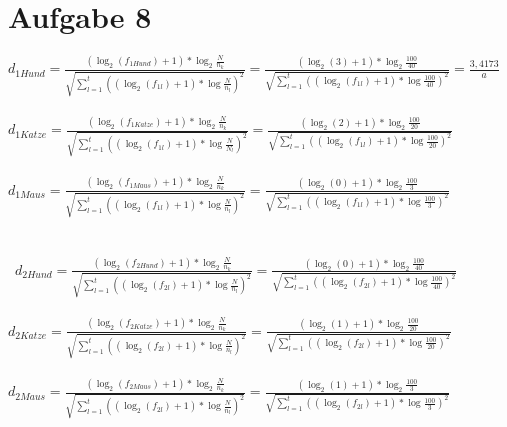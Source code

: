 \section*{Aufgabe 8}

$d_{1Hund} =\frac{(\log_{2}(f_{1Hund}) + 1) * \log_{2}\frac{N}{n_{k}}}{\sqrt{\sum_{l=1}^{t}((\log_{2}(f_{1l}) + 1) * \log \frac{N}{n_{l}})^{2}}} = \frac{(\log_{2}(3) + 1) * \log_{2}\frac{100}{40}}{\sqrt{\sum_{l=1}^{t}((\log_{2}(f_{1l}) + 1) * \log \frac{100}{40})^{2}}} = \frac{3,4173}{a}$ \\
\ \\
$d_{1Katze} =\frac{(\log_{2}(f_{1Katze}) + 1) * \log_{2}\frac{N}{n_{k}}}{\sqrt{\sum_{l=1}^{t}((\log_{2}(f_{1l}) + 1) * \log \frac{N}{N_{l}})^{2}}} = \frac{(\log_{2}(2) + 1) * \log_{2}\frac{100}{20}}{\sqrt{\sum_{l=1}^{t}((\log_{2}(f_{1l}) + 1) * \log \frac{100}{20})^{2}}}$ \\
\ \\
$d_{1Maus} =\frac{(\log_{2}(f_{1Maus}) + 1) * \log_{2}\frac{N}{n_{k}}}{\sqrt{\sum_{l=1}^{t}((\log_{2}(f_{1l}) + 1) * \log \frac{N}{n_{l}})^{2}}} = \frac{(\log_{2}(0) + 1) * \log_{2}\frac{100}{3}}{\sqrt{\sum_{l=1}^{t}((\log_{2}(f_{1l}) + 1) * \log \frac{100}{3})^{2}}}$ \\
\\ \
\\ \
$d_{2Hund} = \frac{(\log_{2}(f_{2Hund}) + 1) * \log_{2}\frac{N}{n_{k}}}{\sqrt{\sum_{l=1}^{t}((\log_{2}(f_{2l}) + 1) * \log \frac{N}{n_{l}})^{2}}} = \frac{(\log_{2}(0) + 1) * \log_{2}\frac{100}{40}}{\sqrt{\sum_{l=1}^{t}((\log_{2}(f_{2l}) + 1) * \log \frac{100}{40})^{2}}}$ \\
\ \\
$d_{2Katze} =\frac{(\log_{2}(f_{2Katze}) + 1) * \log_{2}\frac{N}{n_{k}}}{\sqrt{\sum_{l=1}^{t}((\log_{2}(f_{2l}) + 1) * \log \frac{N}{n_{l}})^{2}}} = \frac{(\log_{2}(1) + 1) * \log_{2}\frac{100}{20}}{\sqrt{\sum_{l=1}^{t}((\log_{2}(f_{2l}) + 1) * \log \frac{100}{20})^{2}}}$ \\
\ \\
$d_{2Maus} =\frac{(\log_{2}(f_{2Maus}) + 1) * \log_{2}\frac{N}{n_{k}}}{\sqrt{\sum_{l=1}^{t}((\log_{2}(f_{2l}) + 1) * \log \frac{N}{n_{l}})^{2}}} = \frac{(\log_{2}(1) + 1) * \log_{2}\frac{100}{3}}{\sqrt{\sum_{l=1}^{t}((\log_{2}(f_{2l}) + 1) * \log \frac{100}{3})^{2}}}$ \\